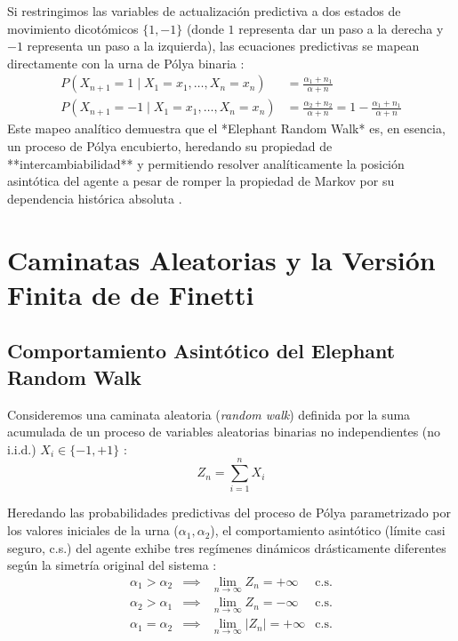 Si restringimos las variables de actualización predictiva a dos estados de movimiento dicotómicos $\{1, -1\}$ (donde $1$ representa dar un paso a la derecha y $-1$ representa un paso a la izquierda), las ecuaciones predictivas se mapean directamente con la urna de Pólya binaria :
\begin{align*}
    P(X_{n+1} = 1 \mid X_1 = x_1, \dots, X_n = x_n) &= \frac{\alpha_1 + n_1}{\alpha + n} \\
    P(X_{n+1} = -1 \mid X_1 = x_1, \dots, X_n = x_n) &= \frac{\alpha_2 + n_2}{\alpha + n} = 1 - \frac{\alpha_1 + n_1}{\alpha + n}
\end{align*}
Este mapeo analítico demuestra que el *Elephant Random Walk* es, en esencia, un proceso de Pólya encubierto, heredando su propiedad de **intercambiabilidad** y permitiendo resolver analíticamente la posición asintótica del agente a pesar de romper la propiedad de Markov por su dependencia histórica absoluta .

\section{Caminatas Aleatorias y la Versión Finita de de Finetti}

\subsection{Comportamiento Asintótico del Elephant Random Walk}

Consideremos una caminata aleatoria (\textit{random walk}) definida por la suma acumulada de un proceso de variables aleatorias binarias no independientes (no i.i.d.) $X_i \in \{-1, +1\}$ :
\begin{equation*}
    Z_n = \sum_{i=1}^{n} X_i 
\end{equation*}

Heredando las probabilidades predictivas del proceso de Pólya parametrizado por los valores iniciales de la urna ($\alpha_1, \alpha_2$), el comportamiento asintótico (límite casi seguro, c.s.) del agente exhibe tres regímenes dinámicos drásticamente diferentes según la simetría original del sistema :
\begin{equation*}
    \begin{array}{llll}
        \alpha_1 > \alpha_2 & \implies & \lim_{n \to \infty} Z_n = +\infty & \text{c.s.} \\
        \alpha_2 > \alpha_1 & \implies & \lim_{n \to \infty} Z_n = -\infty & \text{c.s.} \\
        \alpha_1 = \alpha_2 & \implies & \lim_{n \to \infty} |Z_n| = +\infty & \text{c.s.}
    \end{array}
\end{equation*}

